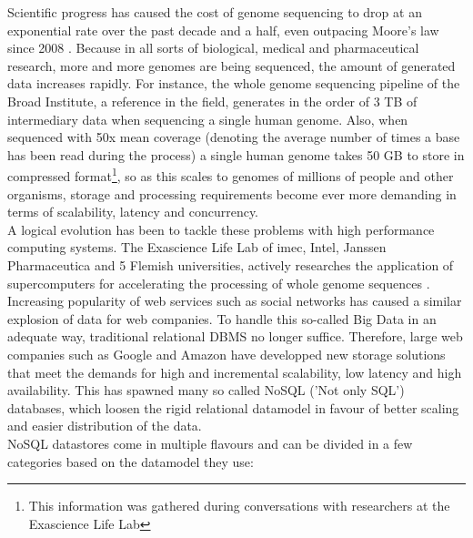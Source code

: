 \documentclass{IEEEtran}
\begin{document}
Scientific progress has caused the cost of genome sequencing to drop at an exponential rate over the past decade and a half, even outpacing Moore's law since 2008 \cite{wetterstrand_sequencing_cost}. Because in all sorts of biological, medical and pharmaceutical research, more and more genomes are being sequenced, the amount of generated data increases rapidly. For instance, the whole genome sequencing pipeline of the Broad Institute\cite{broad_institute}, a reference in the field, generates in the order of 3 TB of intermediary data when sequencing a single human genome. Also, when sequenced with 50x mean coverage (denoting the average number of times a base has been read during the process\cite{coverage_definition}) a single human genome takes 50 GB to store in compressed format\footnote{This information was gathered during conversations with researchers at the Exascience Life Lab}, so as this scales to genomes of millions of people and other organisms, storage and processing requirements become ever more demanding in terms of scalability, latency and concurrency.
\\A logical evolution has been to tackle these problems with high performance computing systems. The Exascience Life Lab of imec, Intel, Janssen Pharmaceutica and 5 Flemish universities, actively researches the application of supercomputers for accelerating the processing of whole genome sequences \cite{exascience_life_lab}\cite{lifelab_BWA}.
\\Increasing popularity of web services such as social networks has caused a similar explosion of data for web companies. To handle this so-called Big Data\cite{mashey1997big} in an adequate way, traditional relational DBMS no longer suffice. Therefore, large web companies such as Google and Amazon have developped new storage solutions that meet the demands for high and incremental scalability, low latency and high availability\cite{baker2011megastore}. This has spawned many so called NoSQL ('Not only SQL') databases, which loosen the rigid relational datamodel in favour of better scaling and easier distribution of the data.
\\NoSQL datastores come in multiple flavours and can be divided in a few cate\-gories based on the datamodel they use:
\end{document}

